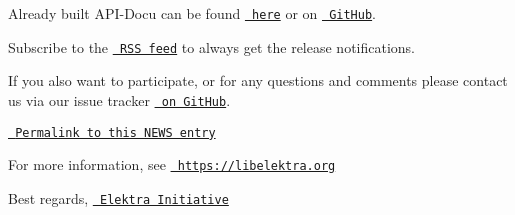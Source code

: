 Already built A\+P\+I-\/\+Docu can be found \href{https://doc.libelektra.org/api/0.9.1/html/}{\texttt{ here}} or on \href{https://github.com/ElektraInitiative/doc/tree/master/api/0.9.1}{\texttt{ Git\+Hub}}.

Subscribe to the \href{https://www.libelektra.org/news/feed.rss}{\texttt{ R\+SS feed}} to always get the release notifications.

If you also want to participate, or for any questions and comments please contact us via our issue tracker \href{http://issues.libelektra.org}{\texttt{ on Git\+Hub}}.

\href{https://www.libelektra.org/news/0.9.1-release}{\texttt{ Permalink to this N\+E\+WS entry}}

For more information, see \href{https://libelektra.org}{\texttt{ https\+://libelektra.\+org}}

Best regards, \href{https://www.libelektra.org/developers/authors}{\texttt{ Elektra Initiative}} 